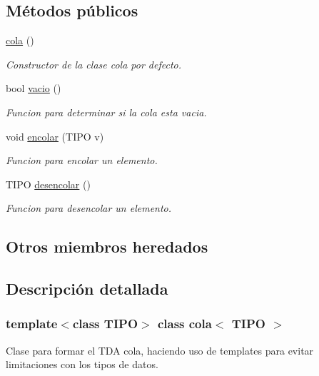 \subsection*{Métodos públicos}
\begin{DoxyCompactItemize}
\item 
\mbox{\label{classcola_acf21bbf0b0795607993d5ffe736398ae}} 
\hyperlink{classcola_acf21bbf0b0795607993d5ffe736398ae}{cola} ()
\begin{DoxyCompactList}\small\item\em Constructor de la clase cola por defecto. \end{DoxyCompactList}\item 
bool \hyperlink{classcola_a2af9a71dd856a907f446a1e396d83e5b}{vacio} ()
\begin{DoxyCompactList}\small\item\em Funcion para determinar si la cola esta vacia. \end{DoxyCompactList}\item 
void \hyperlink{classcola_a4fe29cbff3478979d38a0f8a2d7a4b51}{encolar} (T\+I\+PO v)
\begin{DoxyCompactList}\small\item\em Funcion para encolar un elemento. \end{DoxyCompactList}\item 
T\+I\+PO \hyperlink{classcola_afbe13fa4237aa2fde61067900ff8f884}{desencolar} ()
\begin{DoxyCompactList}\small\item\em Funcion para desencolar un elemento. \end{DoxyCompactList}\end{DoxyCompactItemize}
\subsection*{Otros miembros heredados}


\subsection{Descripción detallada}
\subsubsection*{template$<$class T\+I\+PO$>$\newline
class cola$<$ T\+I\+P\+O $>$}

Clase para formar el T\+DA cola, haciendo uso de templates para evitar limitaciones con los tipos de datos. 


